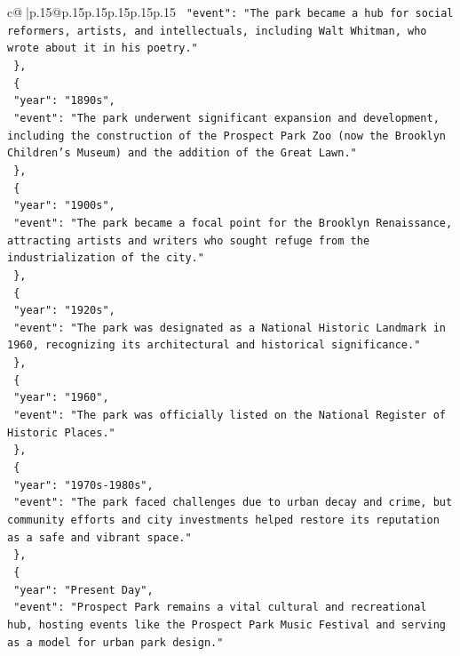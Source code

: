 \documentclass{article}
\begin{document}
{\begin{supertabular}{c@{$\;$}|p{.15\linewidth}@{}p{.15\linewidth}p{.15\linewidth}p{.15\linewidth}p{.15\linewidth}p{.15\linewidth}}
{{{\texttt{      "event": "The park became a hub for social reformers, artists, and intellectuals, including Walt Whitman, who wrote about it in his poetry."} \\
\texttt{    \},} \\
\texttt{    \{} \\
\texttt{      "year": "1890s",} \\
\texttt{      "event": "The park underwent significant expansion and development, including the construction of the Prospect Park Zoo (now the Brooklyn Children's Museum) and the addition of the Great Lawn."} \\
\texttt{    \},} \\
\texttt{    \{} \\
\texttt{      "year": "1900s",} \\
\texttt{      "event": "The park became a focal point for the Brooklyn Renaissance, attracting artists and writers who sought refuge from the industrialization of the city."} \\
\texttt{    \},} \\
\texttt{    \{} \\
\texttt{      "year": "1920s",} \\
\texttt{      "event": "The park was designated as a National Historic Landmark in 1960, recognizing its architectural and historical significance."} \\
\texttt{    \},} \\
\texttt{    \{} \\
\texttt{      "year": "1960",} \\
\texttt{      "event": "The park was officially listed on the National Register of Historic Places."} \\
\texttt{    \},} \\
\texttt{    \{} \\
\texttt{      "year": "1970s{-}1980s",} \\
\texttt{      "event": "The park faced challenges due to urban decay and crime, but community efforts and city investments helped restore its reputation as a safe and vibrant space."} \\
\texttt{    \},} \\
\texttt{    \{} \\
\texttt{      "year": "Present Day",} \\
\texttt{      "event": "Prospect Park remains a vital cultural and recreational hub, hosting events like the Prospect Park Music Festival and serving as a model for urban park design."} \\
}}}
\end{supertabular}}
\end{document}
